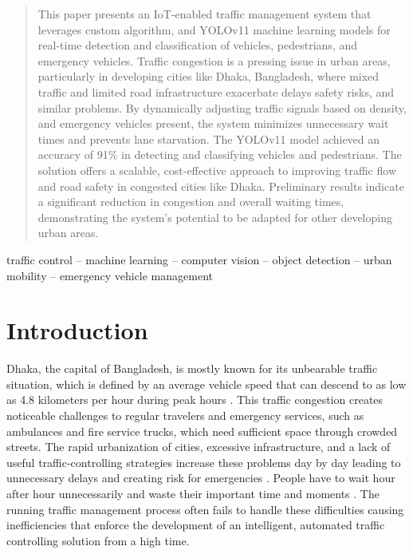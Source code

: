 \documentclass[conference]{IEEEtran}
\begin{document}
\maketitle



\begin{abstract}
This paper presents an IoT-enabled traffic management system that leverages custom algorithm, and YOLOv11 machine learning models for real-time detection and classification of vehicles, pedestrians, and emergency vehicles. 
Traffic congestion is a pressing issue in urban areas, particularly in developing cities like Dhaka, Bangladesh, where mixed traffic and limited road infrastructure exacerbate delays safety risks, and similar problems.
By dynamically adjusting traffic signals based on density, and emergency vehicles present, the system minimizes unnecessary wait times and prevents lane starvation. The YOLOv11 model achieved an accuracy of 91\% in detecting and classifying vehicles and pedestrians. The solution offers a scalable, cost-effective approach to improving traffic flow and road safety in congested cities like Dhaka. Preliminary results indicate a significant reduction in congestion and overall waiting times, demonstrating the system's potential to be adapted for other developing urban areas.
\end{abstract}

\begin{IEEEkeywords}
traffic control -- machine learning -- computer vision -- object detection -- urban mobility -- emergency vehicle management
\end{IEEEkeywords}

\section{Introduction}
Dhaka, the capital of Bangladesh, is mostly known for its unbearable traffic situation, which is defined by an average vehicle speed that can descend to as low as 4.8 kilometers per hour during peak hours \cite{clar:a1}. This traffic congestion creates noticeable challenges to regular travelers and emergency services, such as ambulances and fire service trucks, which need sufficient space through crowded streets. The rapid urbanization of cities, excessive infrastructure, and a lack of useful traffic-controlling strategies increase these problems day by day leading to unnecessary delays and creating risk for emergencies \cite{clar:a16}. People have to wait hour after hour unnecessarily and waste their important time and moments \cite{clar:a2}. The running traffic management process often fails to handle these difficulties causing inefficiencies that enforce the development of an intelligent, automated traffic controlling solution from a high time.  
\end{document}
